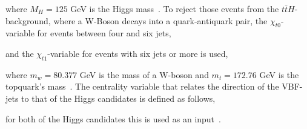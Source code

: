 
where $M_H = 125$ GeV is the Higgs mass~\cite{Run2analysisnote}. To reject those events from the $t \bar{t}H$-background, where a W-Boson decays into a quark-antiquark pair, the $\chi_{t0}$-variable for events between four and six jets,


and the $\chi_{t1}$-variable for events with six jets or more is used,


where $m_w=80.377$ GeV is the mass of a W-boson and $m_t=172.76$ GeV is the topquark's mass~\cite{Run2analysisnote}.
The centrality variable that relates the direction of the VBF-jets to that of the Higgs candidates is defined as follows,


for both of the Higgs candidates this is used as an input~\cite{CMS:2021qbp}. \\





